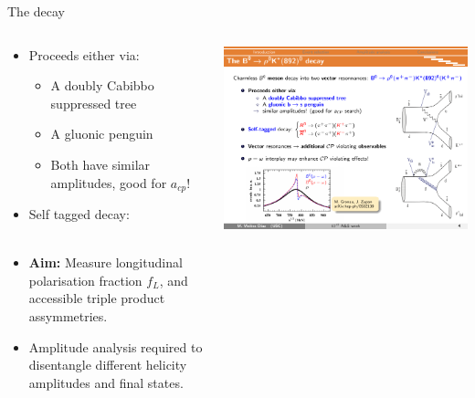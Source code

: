 \documentclass{beamer}
\begin{document}
\begin{frame}{The \decay{\Bd}{\rhoz(\pi \pi)\Kstarz(\Kp\pim)} decay}
  \begin{columns}
    \begin{column}{.75\textwidth}
      \begin{itemize}
        \item Proceeds either via:
        \begin{itemize}
        \item A doubly Cabibbo suppressed tree
        \item A gluonic \decay{\bquark}{\squark} penguin
        \item Both have similar amplitudes, good for $a_{cp}$!
        \end{itemize}
      \item Self tagged decay: \\ \decay{\textcolor{red}{\Bd}}{\rhoz(\pi \pi)\Kstarz(\textcolor{red}{\Kp}\pim)} \\ \decay{\textcolor{red}{\Bdb}}{\rhoz(\pi \pi)\Kstarz(\textcolor{red}{\Km}\pip)}
      \item \textbf{Aim:} Measure longitudinal polarisation fraction $f_L$, \ACP and accessible triple product assymmetries.
      \item Amplitude analysis required to disentangle different helicity amplitudes and final states.
      \end{itemize}
    \end{column}
    \begin{column}{.24\textwidth}
      \includegraphics[width=\textwidth]{KstarRhoFeynman.pdf}
    \end{column}
  \end{columns}
\end{frame}
\end{document}

